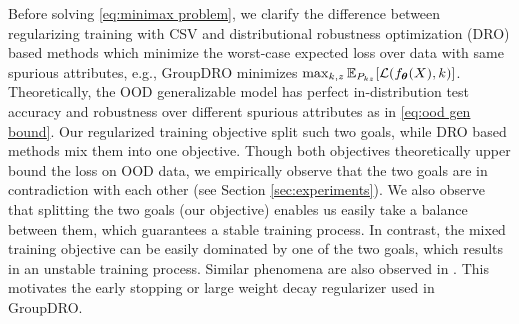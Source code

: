\documentclass{article} %
\newcommand{\btheta}{\text{\boldmath{$\theta$}}}
\newcommand{\bx}{\boldsymbol{x}}
\newcommand{\mE}{\mathbb{E}}
\newcommand{\cL}{\mathcal{L}}
\begin{document}
	\par
	Before solving \eqref{eq:minimax problem}, we clarify the difference between regularizing training with CSV and distributional robustness optimization (DRO) based methods which minimize the worst-case expected loss over data with same spurious attributes, e.g., GroupDRO \citep{sagawa2019distributionally} minimizes $\max_{k,z}\mE_{P_{kz}}[\cL(f_{\btheta}(X), k)]$. Theoretically, the OOD generalizable model has perfect in-distribution test accuracy and robustness over different spurious attributes as in \eqref{eq:ood gen bound}. Our regularized training objective split such two goals, while DRO based methods mix them into one objective. Though both objectives theoretically upper bound the loss on OOD data, we empirically observe that the two goals are in contradiction with each other (see Section \ref{sec:experiments}). We also observe that splitting the two goals (our objective) enables us easily take a balance between them, which guarantees a stable training process. In contrast, the mixed training objective can be easily dominated by one of the two goals, which results in an unstable training process.  Similar phenomena are also observed in \citep{sagawa2019distributionally}. This motivates the early stopping or large weight decay regularizer used in GroupDRO.
\end{document}
